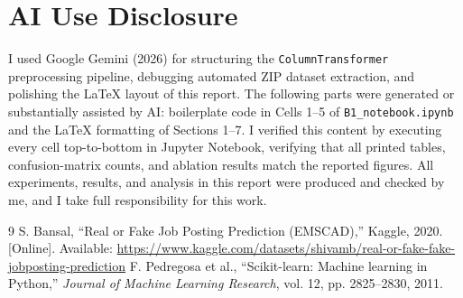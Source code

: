 \documentclass[conference,a4paper]{IEEEtran}
\begin{document}
\section*{AI Use Disclosure}
I used Google Gemini (2026) for structuring the \texttt{ColumnTransformer} preprocessing pipeline, debugging automated ZIP dataset extraction, and polishing the LaTeX layout of this report. The following parts were generated or substantially assisted by AI: boilerplate code in Cells 1--5 of \texttt{B1\_notebook.ipynb} and the LaTeX formatting of Sections 1--7. I verified this content by executing every cell top-to-bottom in Jupyter Notebook, verifying that all printed tables, confusion-matrix counts, and ablation results match the reported figures. All experiments, results, and analysis in this report were produced and checked by me, and I take full responsibility for this work.

\begin{thebibliography}{9}
 S. Bansal, ``Real or Fake Job Posting Prediction (EMSCAD),'' Kaggle, 2020. [Online]. Available: \url{https://www.kaggle.com/datasets/shivamb/real-or-fake-fake-jobposting-prediction}
 F. Pedregosa et al., ``Scikit-learn: Machine learning in Python,'' \textit{Journal of Machine Learning Research}, vol. 12, pp. 2825--2830, 2011.
\end{thebibliography}
\end{document}
